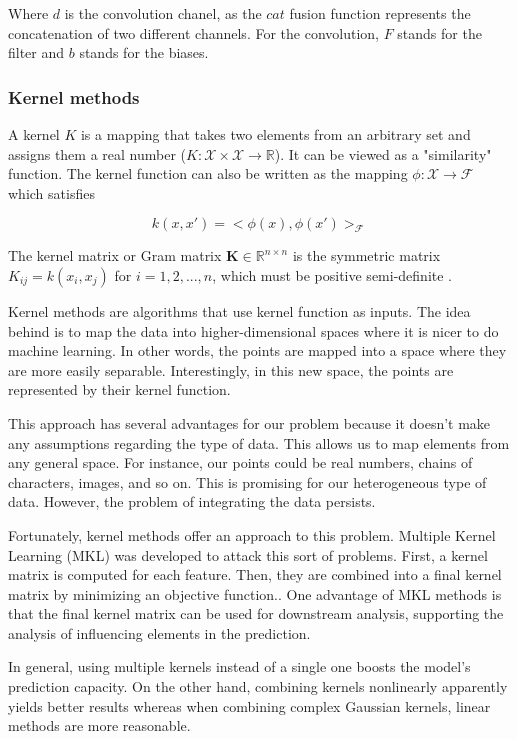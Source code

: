 \documentclass[11pt,a4paper]{article}
\begin{document}
Where $d$ is the convolution chanel, as the $cat$ fusion function represents the concatenation of two different channels. For the convolution, $F$ stands for the filter and $b$ stands for the biases. 



\subsubsection{Kernel methods}

A kernel $K$ is a mapping that takes two elements from an arbitrary set and assigns them a real number ($K : \mathcal{X} \times \mathcal{X} \longrightarrow \mathbb{R}$). It can be viewed as a "similarity" function. The kernel function can also be written as the mapping $\phi : \mathcal{X} \longrightarrow \mathcal{F} $ which satisfies 

$$
k(x,x')=<\phi(x),\phi(x')>_\mathcal{F}
$$

The kernel matrix or Gram matrix $ \mathbf{K} \in \mathbb{R}^{n \times n} $ is the symmetric matrix $K_{ij}  = k(x_i,x_j)$ for $i=1,2,...,n$, which must be positive semi-definite \cite{mva_kernels_2022}. 

Kernel methods are algorithms that use kernel function as inputs. The idea behind is to map the data into higher-dimensional spaces where it is nicer to do machine learning. In other words, the points are mapped into a space where they are more easily separable. Interestingly, in this new space, the points are represented by their kernel function. 

This approach has several advantages for our problem because it doesn't make any assumptions regarding the type of data. This allows us to map elements from any general space. For instance, our points could be real numbers, chains of characters, images, and so on. This is promising for our heterogeneous type of data. However, the problem of integrating the data persists. 

Fortunately, kernel methods offer an approach to this problem. Multiple Kernel Learning (MKL) was developed to attack this sort of problems. First, a kernel matrix is computed for each feature. Then, they are combined into a final kernel matrix by minimizing an objective function.\cite{Baiao2025}. One advantage of MKL methods is that the final kernel matrix can be used for downstream analysis, supporting the analysis of influencing elements in the prediction.

In general, using multiple kernels instead of a single one boosts the model's prediction capacity. On the other hand, combining kernels nonlinearly apparently yields better results whereas when combining complex Gaussian kernels, linear methods are more reasonable\cite{gonen2011multiple}. 
\end{document}
